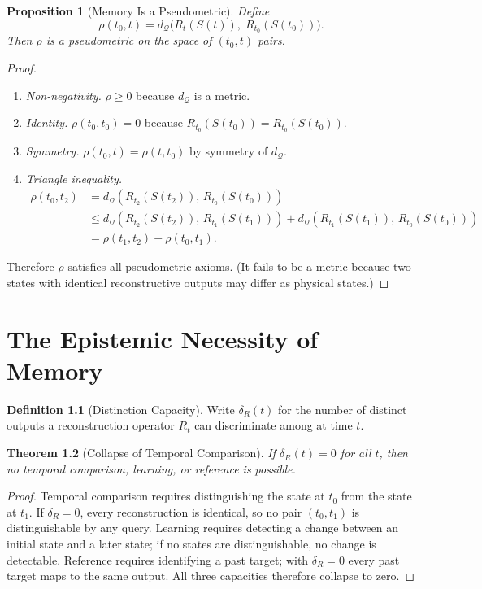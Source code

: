 \documentclass[12pt, oneside]{book}
\theoremstyle{plain}
\newtheorem{theorem}{Theorem}[chapter]
\newtheorem{proposition}[theorem]{Proposition}
\theoremstyle{definition}
\newtheorem{definition}[theorem]{Definition}
\theoremstyle{remark}
\newcommand{\calQ}{\mathcal{Q}}
\begin{document}
\begin{proposition}[Memory Is a Pseudometric]
Define
\[
  \rho(t_0, t)
  = d_{\calQ}\!\bigl(R_t(S(t)),\; R_{t_0}(S(t_0))\bigr).
\]
Then $\rho$ is a pseudometric on the space of
$(t_0, t)$ pairs.
\end{proposition}

\begin{proof}
\begin{enumerate}
\item \emph{Non-negativity.} $\rho \geq 0$ because $d_{\calQ}$
      is a metric.
\item \emph{Identity.} $\rho(t_0, t_0) = 0$ because
      $R_{t_0}(S(t_0)) = R_{t_0}(S(t_0))$.
\item \emph{Symmetry.} $\rho(t_0,t) = \rho(t, t_0)$ by
      symmetry of $d_{\calQ}$.
\item \emph{Triangle inequality.}
      \begin{align*}
        \rho(t_0, t_2)
        &= d_{\calQ}(R_{t_2}(S(t_2)),\, R_{t_0}(S(t_0)))\\
        &\leq d_{\calQ}(R_{t_2}(S(t_2)),\, R_{t_1}(S(t_1)))
           + d_{\calQ}(R_{t_1}(S(t_1)),\, R_{t_0}(S(t_0)))\\
        &= \rho(t_1, t_2) + \rho(t_0, t_1).
      \end{align*}
\end{enumerate}
Therefore $\rho$ satisfies all pseudometric axioms.
(It fails to be a metric because two states with identical
reconstructive outputs may differ as physical states.)
\end{proof}

\chapter{The Epistemic Necessity of Memory}

\begin{definition}[Distinction Capacity]
Write $\delta_R(t)$ for the number of distinct outputs
a reconstruction operator $R_t$ can discriminate among
at time $t$.
\end{definition}

\begin{theorem}[Collapse of Temporal Comparison]
\label{thm:collapse}
If $\delta_R(t) = 0$ for all $t$, then no temporal
comparison, learning, or reference is possible.
\end{theorem}

\begin{proof}
Temporal comparison requires distinguishing the state
at $t_0$ from the state at $t_1$.
If $\delta_R = 0$, every reconstruction is identical,
so no pair $(t_0, t_1)$ is distinguishable by any query.
Learning requires detecting a change between an initial
state and a later state; if no states are distinguishable,
no change is detectable.
Reference requires identifying a past target; with
$\delta_R = 0$ every past target maps to the same output.
All three capacities therefore collapse to zero.
\end{proof}
\end{document}
